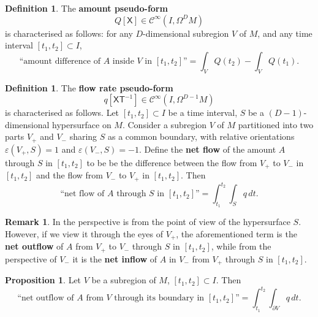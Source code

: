 \documentclass{elsarticle}
\theoremstyle{definition}
\newtheorem{proposition}[theorem]{Proposition}
\newtheorem{definition}[theorem]{Definition}
\newtheorem{remark}[theorem]{Remark}
\newcommand{\newterm}[1]{\textbf{#1}}
\newcommand{\amount}{\mathsf{X}}
\renewcommand{\time}{\mathsf{T}}
\begin{document}
\begin{definition}
  The \newterm{amount pseudo-form}
  \begin{equation}
    \label{eq:continuum/amount_definition}
    Q [\amount] \in \mathcal{C}^\infty(I, \Omega^D M)
  \end{equation}
  is characterised as follows: for any $D$-dimensional subregion $V$ of $M$, and any time interval $[t_1, t_2] \subset I$,
  \begin{equation}
    \label{eq:continuum/amount_difference}
    \textrm{``amount difference of $A$ inside $V$ in $[t_1, t_2]$''} = \int_V Q(t_2) - \int_V Q(t_1).
  \end{equation}
\end{definition}
\begin{definition}
  \label{def:continuum/flow_rate}
  The \newterm{flow rate pseudo-form}
  \begin{equation}
    \label{eq:continuum/flow_rate_definition}
    q [\amount \time^{-1}] \in \mathcal{C}^\infty(I, \Omega^{D - 1} M)
  \end{equation}
  is characterised as follows.
  Let $[t_1, t_2] \subset I$ be a time interval, $S$ be a $(D - 1)$-dimensional hypersurface on $M$.
  Consider a subregion $V$ of $M$ partitioned into two parts $V_{+}$ and $V_{-}$ sharing $S$ as a common boundary,
  with relative orientations
  $\varepsilon(V_{+}, S) = 1$ and $\varepsilon(V_{-}, S) = -1$.
  Define the \newterm{net flow} of the amount $A$ through $S$ in $[t_1, t_2]$ to be be the difference between the flow from $V_{+}$ to $V_{-}$ in $[t_1, t_2]$ and the flow from $V_{-}$ to $V_{+}$ in $[t_1, t_2]$.
  Then
  \begin{equation}
    \label{eq:continuum/net_flow_through_surface}
    \textrm{``net flow of $A$ through $S$ in $[t_1, t_2]$''} = \int_{t_1}^{t_2} \int_S q\, d t.
  \end{equation}
\end{definition}
\begin{remark}
  In 
  the perspective is from the point of view of the hypersurface $S$.
  However, if we view it through the eyes of $V_{+}$, the aforementioned term is the \newterm{net outflow} of $A$ from $V_{+}$ to $V_{-}$ through $S$ in $[t_1, t_2]$,
  while from the perspective of $V_{-}$ it is the \newterm{net inflow} of $A$ in $V_{-}$ from $V_{+}$ through $S$ in $[t_1, t_2]$.
\end{remark}
\begin{proposition}
  Let $V$ be a subregion of $M$, $[t_1, t_2] \subset I$.
  Then
  \begin{equation}
    \label{eq:continuum/net_boundary_outflow}
    \textrm{``net outflow of $A$ from $V$ through its boundary in $[t_1, t_2]$''}
    = \int_{t_1}^{t_2} \int_{\partial V} q\, d t.
  \end{equation}
\end{proposition}
\end{document}
